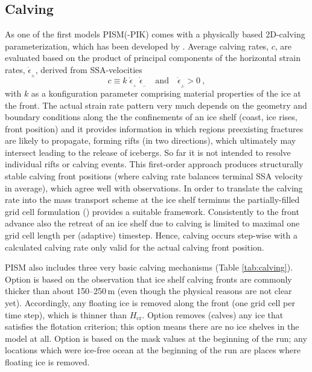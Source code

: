 \subsection{Calving}
\label{sec:calving}
As one of the first models PISM(-PIK) comes with a physically based 2D-calving parameterization, which has been developed by \cite{LevermannAlbrecht11}. Average calving rates, $c$, are evaluated based on the product of principal components of the horizontal strain rates, $\dot{\epsilon}_{_\pm}$, derived from SSA-velocities 
\begin{equation}
\label{eq: calv2}
c \equiv k\; \dot{\epsilon}_{_+}\; \dot{\epsilon}_{_-}\quad\text{and}\quad\dot{\epsilon}_{_\pm}>0\:,
\end{equation}
with $k$ as a konfiguration parameter comprising material properties of the ice at the front. The actual strain rate pattern very much depends on the geometry and boundary conditions along the the confinements of an ice shelf (coast, ice rises, front position) and it provides information in which regions preexisting fractures are likely to propagate, forming rifts (in two directions), which ultimately may intersect leading to the release of icebergs. So far it is not intended to resolve individual rifts or calving events. This first-order approach produces structurally stable calving front positions (where calving rate balances terminal SSA velocity in average), which agree well with observations. In order to translate the calving rate into the mass transport scheme at the ice shelf terminus the partially-filled grid cell formulation (\label{sec:part-grid}) provides a suitable framework. Consistently to the front advance also the retreat of an ice shelf due to calving is limited to maximal one grid cell length per (adaptive) timestep. Hence, calving occurs step-wise with a calculated calving rate only valid for the actual calving front position. \newline

PISM also includes three very basic calving mechanisms (Table \ref{tab:calving}). Option  is based on the observation that ice shelf calving fronts are commonly thicker than about 150--250\,m (even though the physical reasons are not clear yet). Accordingly, any floating ice is removed along the front (one grid cell per time step), which is thinner than $H_{\textrm{cr}}$.  Option  removes (calves) any ice that satisfies the flotation criterion; this option means there are no ice shelves in the model at all.  Option  is based on the mask values at the beginning of the run; any locations which were ice-free ocean at the beginning of the run are places where floating ice is removed.

